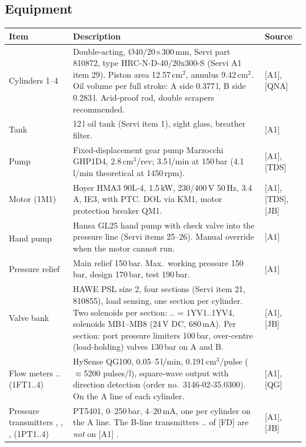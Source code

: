 \documentclass[11pt,a4paper]{article}
\newcommand{\prop}{\textsuperscript{\dag}}  %
\begin{document}
\subsection{Equipment}
\begin{small}
\begin{tabularx}{\textwidth}{@{}P{30mm}LP{26mm}@{}}
\toprule
Item & Description & Source \\
\midrule
Cylinders 1--4 & Double-acting, \O40/20$\times$300\,mm, Servi part 810872, type HRC-N-D-40/20x300-S (Servi A1 item 29).
  Piston area 12.57\,cm$^2$, annulus 9.42\,cm$^2$. Oil volume per full stroke: A side 0.377\,l, B side 0.283\,l. Acid-proof rod, double scrapers recommended. & [A1], [QNA] \\
Tank  & 12\,l oil tank (Servi item 1), sight glass, breather filter. & [A1] \\
Pump  & Fixed-displacement gear pump Marzocchi GHP1D4, 2.8\,cm$^3$/rev; 3.5\,l/min at 150\,bar (4.1\,l/min theoretical at 1450\,rpm). & [A1], [TDS] \\
Motor  (1M1) & Hoyer HMA3 90L-4, 1.5\,kW, 230/400\,V 50\,Hz, 3.4\,A, IE3, with PTC. DOL via KM1, motor protection breaker QM1. & [A1], [TDS], [JB] \\
Hand pump \prop & Hansa GL25 hand pump with check valve into the pressure line (Servi items 25--26). Manual override when the motor cannot run. & [A1] \\
Pressure relief & Main relief 150\,bar. Max.\ working pressure 150\,bar, design 170\,bar, test 190\,bar. & [A1] \\
Valve bank & HAWE PSL size 2, four sections (Servi item 21, 810855), load sensing, one section per cylinder.
  Two solenoids per section: .. = 1YV1..1YV4, solenoids MB1--MB8 (24\,V DC, 680\,mA). Per section: port pressure limiters 100\,bar, over-centre (load-holding) valves 130\,bar on A and B. & [A1], [JB] \\
Flow meters .. (1FT1..4) & HySense QG100, 0.05--5\,l/min, 0.191\,cm$^3$/pulse ($\approx$5200 pulses/l), square-wave output with direction detection (order no.\ 3146-02-35.0300). On the A line of each cylinder. & [A1], [QG] \\
Pressure transmitters , , ,  (1PT1..4) & PT5401, 0--250\,bar, 4--20\,mA, one per cylinder on the A line. The B-line transmitters .. of [FD] are \emph{not} on [A1] . & [A1], [JB] \\

\end{tabularx}
\end{small}
\end{document}
